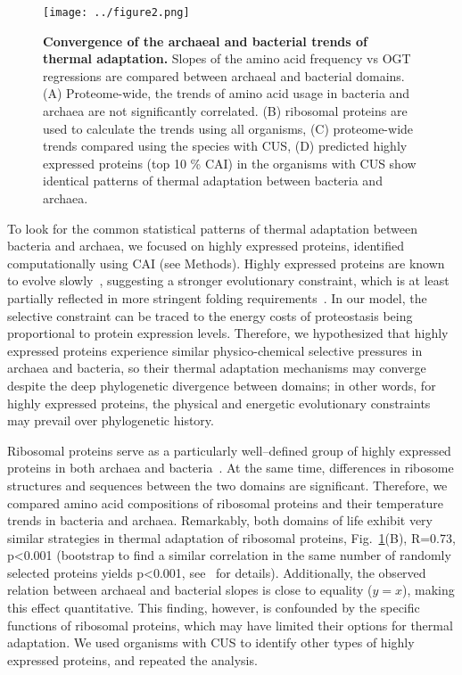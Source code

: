 \documentclass[10pt,letterpaper]{article}
\begin{document}
\begin{figure}[h!]
\texttt{[image: ../figure2.png]}
\caption{
{\bf Convergence of the archaeal and bacterial trends of thermal adaptation.} Slopes of the amino acid frequency vs OGT regressions are compared between archaeal and bacterial domains.
(A) Proteome-wide, the trends of amino acid usage in bacteria and archaea are not significantly correlated.
(B) ribosomal proteins are used to calculate the trends using all organisms,
(C) proteome-wide trends compared using the species with CUS,
(D) predicted highly expressed proteins (top 10 \% CAI) in the organisms with CUS show identical patterns of thermal adaptation between bacteria and archaea.
}
\label{fig:fig2}
\end{figure}

To look for the common statistical patterns of thermal adaptation between bacteria and archaea, we focused on highly expressed proteins, identified computationally using CAI (see Methods). Highly expressed proteins are known to evolve slowly~\cite{Pal2001Highly,Rocha2004An}, suggesting a stronger evolutionary constraint, which is at least partially reflected in more stringent folding requirements~\cite{Serohijos2012Protein,Drummond2005Why,Drummond2008MistranslationInduced}. %
In our model, the selective constraint can be traced to the energy costs of proteostasis being proportional to protein expression levels. Therefore, we hypothesized that highly expressed proteins experience similar physico-chemical selective pressures in archaea and bacteria, so their thermal adaptation mechanisms may converge despite the deep phylogenetic divergence between domains; in other words, for highly expressed proteins, the physical and energetic evolutionary constraints may prevail over phylogenetic history.

Ribosomal proteins serve as a particularly well--defined group of highly expressed proteins in both archaea and bacteria~\cite{Karlin2005Predicted}. At the same time, differences in ribosome structures and sequences between the two domains are significant. Therefore, we compared amino acid compositions of ribosomal proteins and their temperature trends in bacteria and archaea. Remarkably, both domains of life exhibit very similar strategies in thermal adaptation of ribosomal proteins, Fig.~\ref{fig:fig2}(B), R=0.73, p\textless 0.001 (bootstrap to find a similar correlation in the same number of randomly selected proteins yields p\textless0.001, see~ for details). Additionally, the observed relation between archaeal and bacterial slopes is close to equality ($y=x$), making this effect quantitative. This finding, however, is confounded by the specific functions of ribosomal proteins, which may have limited their options for thermal adaptation. We used organisms with CUS to identify other types of highly expressed proteins, and repeated the analysis.
\end{document}
